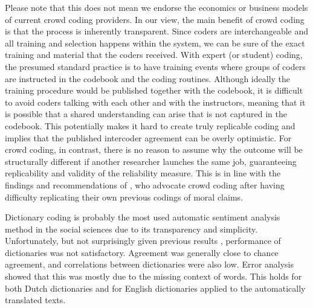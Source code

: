 Please note that this does not mean we endorse the economics or business models of current crowd coding providers. 
In our view, the main benefit of crowd coding is that the process is inherently transparent. 
Since coders are interchangeable and all training and selection happens within the system, 
we can be sure of the exact training and material that the coders received.
With expert (or student) coding, the presumed standard practice is to have training events where groups of coders are instructed
in the codebook and the coding routines. 
Although ideally the training procedure would be published together with the codebook,
it is difficult to avoid coders talking with each other and with the instructors, meaning that it is possible that a shared
understanding can arise that is not captured in the codebook.
This potentially makes it hard to create truly replicable coding and implies that the published intercoder agreement can be overly optimistic. 
For crowd coding, in contrast, there is no reason to assume why the outcome will be structurally different if another researcher launches the same job, guaranteeing replicability and validity of the reliability measure. 
This is in line with the findings and recommendations of \citet{weber18}, who advocate crowd coding after having difficulty replicating their own previous codings of moral claims.

Dictionary coding is probably the most used automatic sentiment analysis method in the social sciences due to its transparency and simplicity.
Unfortunately, but not surprisingly given previous results \citep{boukes2019,soroka15,gonzalez15}, performance of dictionaries was not satisfactory. 
Agreement was generally close to chance agreement, and correlations between dictionaries were also low.
Error analysis showed that this was mostly due to the missing context of words.
This holds for both Dutch dictionaries and for English dictionaries applied to the automatically translated texts.

